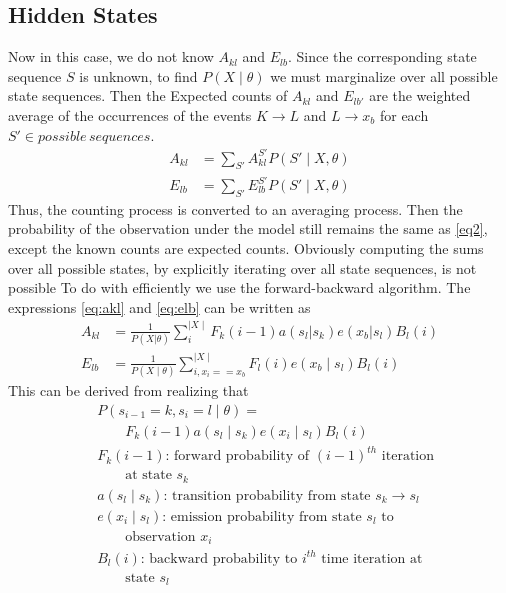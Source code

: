 \documentclass[11pt,letterpaper]{article}
\begin{document}
\subsection{Hidden States}
Now in this case, we do not know $A_{kl}$ and $E_{lb}$. Since the corresponding
state sequence $S$ is unknown, to find $P(X\mid \theta)$ we must marginalize
over all possible state sequences. Then the Expected counts of $A_{kl}$ and
$E_{lb'}$ are the weighted average of the occurrences of the events
$K \rightarrow L$ and $L \rightarrow x_b$ for each $S' \in possible\,sequences$.
\begin{align}
A_{kl} &= \sum_{S'} A^{S'}_{kl} P(S' \mid X, \theta)\label{eq:akl}\\
E_{lb} &= \sum_{S'} E^{S'}_{lb} P(S' \mid X, \theta)\label{eq:elb}
\end{align}
Thus, the counting process is converted to an averaging process. Then the
probability of the observation under the model still remains the same as
\eqref{eq2}, except the known counts are expected counts. Obviously computing
the sums over all possible states, by explicitly iterating over all state sequences, is not possible
To do with efficiently we use the
forward-backward algorithm. The expressions \eqref{eq:akl} and \eqref{eq:elb}
can be written as
\begin{align}
A_{kl} &= \frac{1}{P(X|\theta)} \sum_i^{\mid X \mid}
F_k(i-1)a(s_l|s_k)e(x_b|s_l) B_l(i) \label{eq:aklfb}\\
E_{lb} &= \frac{1}{P(X\mid \theta)} \sum_{i,x_i == x_b}^{\mid X \mid}
F_l(i)e(x_b  \mid s_l)B_l(i) \label{eq:elbfb}
\end{align}
This can be derived from realizing that 
\begin{align*}
& P(s_{i-1} = k, s_i = l \mid \theta) = \\
& \quad\quad F_k(i-1)a(s_l \mid
s_k)e(x_i \mid s_l)B_l(i)\\
& F_k(i-1) \text{: forward probability of $(i-1)^{th}$ iteration}\\ &\quad\quad \text{at state $s_k$}\\
& a(s_l \mid s_k) \text{: transition probability from state $s_k \rightarrow s_l$}\\
& e(x_i \mid s_l) \text{: emission probability from state $s_l$ to}\\ &\quad\quad \text{observation $x_i$}\\
& B_l(i) \text{: backward probability to $i^{th}$ time iteration at}\\ &\quad\quad \text{state $s_l$}
\end{align*}
\end{document}
